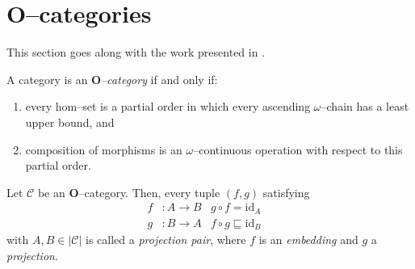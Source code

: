 \section{\(\mathbf{O}\)--categories}

This section goes along with the work presented in \cite{MR677666}.

\begin{dfn}
  A category is an \emph{\(\mathbf{O}\)--category} if and only if:
  \begin{enumerate}
    \item every hom--set is a partial order in which every ascending \(\omega\)--chain has a least upper bound, and
    \item composition of morphisms is an \(\omega\)--continuous operation with respect to this partial order.
  \end{enumerate}
\end{dfn}

\begin{dfn}
  Let \(\mathcal{C}\) be an \(\mathbf{O}\)--category. Then, every tuple \((f,g)\) satisfying
  \begin{align}
    f &\colon A \to B & g \circ f = \mathrm{id}_A \quad  \\
    g &\colon B \to A & f \circ g \sqsubseteq \mathrm{id}_B \quad 
  \end{align}
  with \(A,B \in \lvert\mathcal{C}\rvert\) is called a \emph{projection pair}, where \(f\) is an \emph{embedding} and \(g\) a \emph{projection}.
\end{dfn}